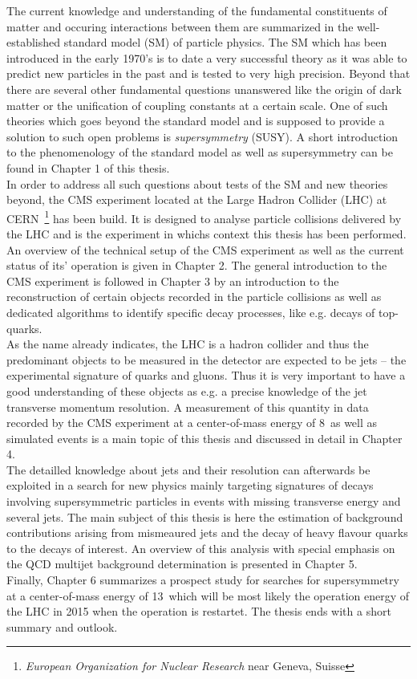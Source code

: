 The current knowledge and understanding of the fundamental constituents of matter and occuring interactions between them are summarized in the well-established standard model (SM) of particle physics. The SM which has been introduced in the early 1970's is to date a very successful theory as it was able to predict new particles in the past and is tested to very high precision. Beyond that there are several other fundamental questions unanswered like the origin of dark matter or the unification of coupling constants at a certain scale. One of such theories which goes beyond the standard model and is supposed to provide a solution to such open problems is \textit{supersymmetry} (SUSY). A short introduction to the phenomenology of the standard model as well as supersymmetry can be found in Chapter 1 of this thesis. \\
In order to address all such questions about tests of the SM and new theories beyond, the CMS experiment located at the Large Hadron Collider (LHC) at CERN~\footnote{\textit{European Organization for Nuclear Research} near Geneva, Suisse} has been build. It is designed to analyse particle collisions delivered by the LHC and is the experiment in whichs context this thesis has been performed. An overview of the technical setup of the CMS experiment as well as the current status of its' operation is given in Chapter 2. The general introduction to the CMS experiment is followed in Chapter 3 by an introduction to the reconstruction of certain objects recorded in the particle collisions as well as dedicated algorithms to identify specific decay processes, like e.g. decays of top-quarks. \\
As the name already indicates, the LHC is a hadron collider and thus the predominant objects to be measured in the detector are expected to be jets -- the experimental signature of quarks and gluons. Thus it is very important to have a good understanding of these objects as e.g. a precise knowledge of the jet transverse momentum resolution. A measurement of this quantity in data recorded by the CMS experiment at a center-of-mass energy of 8~\tev as well as simulated events is a main topic of this thesis and discussed in detail in Chapter 4. \\
The detailled knowledge about jets and their resolution can afterwards be exploited in a search for new physics mainly targeting signatures of decays involving supersymmetric particles in events with missing transverse energy and several jets. The main subject of this thesis is here the estimation of background contributions arising from mismeaured jets and the decay of heavy flavour quarks to the decays of interest. An overview of this analysis with special emphasis on the QCD multijet background determination is presented in Chapter 5. \\
Finally, Chapter 6 summarizes a prospect study for searches for supersymmetry at a center-of-mass energy of 13~\tev which will be most likely the operation energy of the LHC in 2015 when the operation is restartet. The thesis ends with a short summary and outlook.  